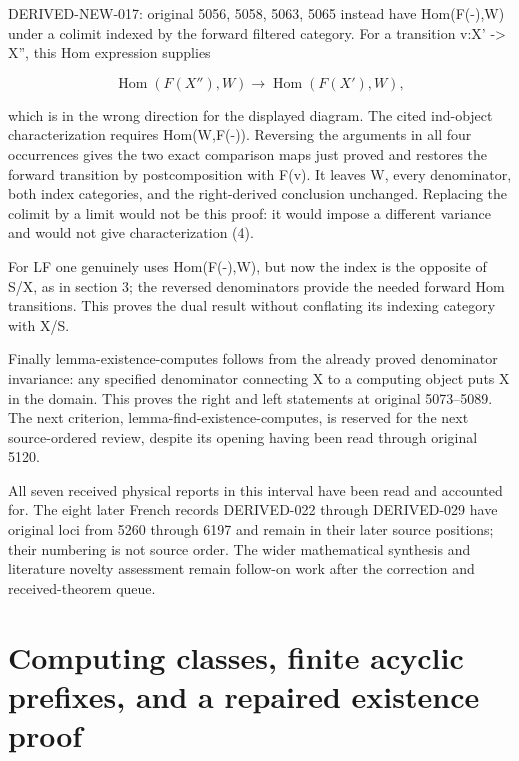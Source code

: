 \documentclass[11pt]{article}
\begin{document}
DERIVED-NEW-017:\allowbreak{} original 5056,\allowbreak{} 5058,\allowbreak{} 5063,\allowbreak{} 5065 instead have Hom(F(-)\allowbreak{},\allowbreak{}W)\allowbreak{} under a colimit indexed by the forward filtered category. For a transition v:\allowbreak{}X' \allowbreak{}-> X'',\allowbreak{} this Hom expression supplies

\[
 \operatorname{Hom}(F(X''),W)\longrightarrow
 \operatorname{Hom}(F(X'),W),
\]

which is in the wrong direction for the displayed diagram. The cited ind-object characterization requires Hom(W,\allowbreak{}F(-)\allowbreak{})\allowbreak{}. Reversing the arguments in all four occurrences gives the two exact comparison maps just proved and restores the forward transition by postcomposition with F(v)\allowbreak{}. It leaves W,\allowbreak{} every denominator,\allowbreak{} both index categories,\allowbreak{} and the right-derived conclusion unchanged. Replacing the colimit by a limit would not be this proof:\allowbreak{} it would impose a different variance and would not give characterization (4)\allowbreak{}.

For LF one genuinely uses Hom(F(-)\allowbreak{},\allowbreak{}W)\allowbreak{},\allowbreak{} but now the index is the opposite of S/\allowbreak{}X,\allowbreak{} as in section 3; the reversed denominators provide the needed forward Hom transitions. This proves the dual result without conflating its indexing category with X/\allowbreak{}S.

Finally lemma-existence-computes follows from the already proved denominator invariance:\allowbreak{} any specified denominator connecting X to a computing object puts X in the domain. This proves the right and left statements at original 5073–\allowbreak{}5089. The next criterion,\allowbreak{} lemma-find-existence-computes,\allowbreak{} is reserved for the next source-ordered review,\allowbreak{} despite its opening having been read through original 5120.

All seven received physical reports in this interval have been read and accounted for. The eight later French records DERIVED-022 through DERIVED-029 have original loci from 5260 through 6197 and remain in their later source positions; their numbering is not source order. The wider mathematical synthesis and literature novelty assessment remain follow-on work after the correction and received-theorem queue.
\clearpage
\section{\texorpdfstring{Computing classes,\allowbreak{} finite acyclic prefixes,\allowbreak{} and a repaired existence proof}{Computing  finite acyclic  and a repaired existence proof}}\label{proofs-5091-5900-computing-classes-finite-acyclic-prefixes-and-a-repaired-existence-proof}
\end{document}
